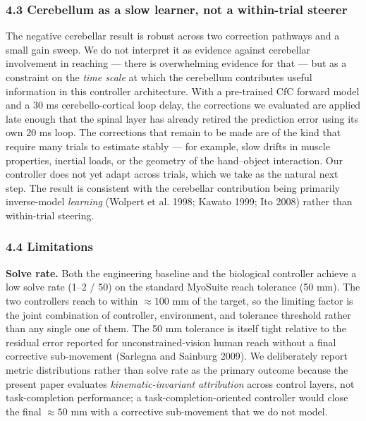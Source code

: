 \documentclass[
  11pt,
]{article}
\begin{document}
\hypertarget{cerebellum-as-a-slow-learner-not-a-within-trial-steerer}{%
\subsubsection{4.3 Cerebellum as a slow learner, not a within-trial
steerer}\label{cerebellum-as-a-slow-learner-not-a-within-trial-steerer}}

The negative cerebellar result is robust across two correction pathways
and a small gain sweep. We do not interpret it as evidence against
cerebellar involvement in reaching --- there is overwhelming evidence
for that --- but as a constraint on the \emph{time scale} at which the
cerebellum contributes useful information in this controller
architecture. With a pre-trained CfC forward model and a 30 ms
cerebello-cortical loop delay, the corrections we evaluated are applied
late enough that the spinal layer has already retired the prediction
error using its own 20 ms loop. The corrections that remain to be made
are of the kind that require many trials to estimate stably --- for
example, slow drifts in muscle properties, inertial loads, or the
geometry of the hand--object interaction. Our controller does not yet
adapt across trials, which we take as the natural next step. The result
is consistent with the cerebellar contribution being primarily
inverse-model \emph{learning} (Wolpert et al. 1998; Kawato 1999; Ito
2008) rather than within-trial steering.

\hypertarget{limitations}{%
\subsubsection{4.4 Limitations}\label{limitations}}

\textbf{Solve rate.} Both the engineering baseline and the biological
controller achieve a low solve rate (1--2 / 50) on the standard MyoSuite
reach tolerance (50 mm). The two controllers reach to within
\(\approx 100\) mm of the target, so the limiting factor is the joint
combination of controller, environment, and tolerance threshold rather
than any single one of them. The 50 mm tolerance is itself tight
relative to the residual error reported for unconstrained-vision human
reach without a final corrective sub-movement (Sarlegna and Sainburg
2009). We deliberately report metric distributions rather than solve
rate as the primary outcome because the present paper evaluates
\emph{kinematic-invariant attribution} across control layers, not
task-completion performance; a task-completion-oriented controller would
close the final \(\approx 50\) mm with a corrective sub-movement that we
do not model.
\end{document}
